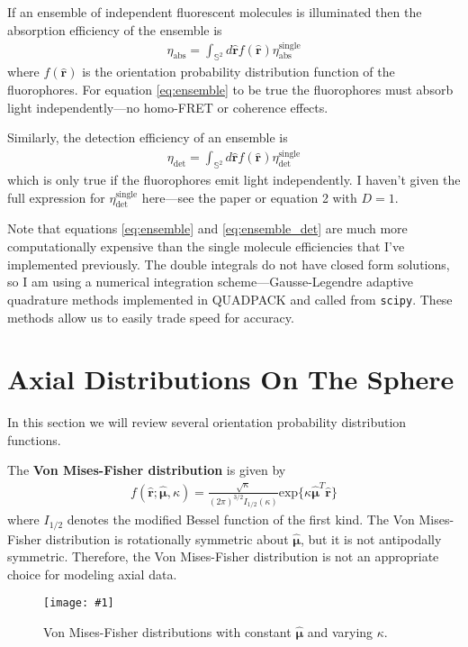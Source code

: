 \documentclass[11pt]{article}
\providecommand{\mh}[1]{\mathbf{\hat{#1}}}
\providecommand{\bs}[1]{\boldsymbol{#1}}
\providecommand{\fig}[4]{
\begin{figure}[h]
 \captionsetup{width=1.0\linewidth}
 \centering
 \texttt{[image: \#1]}
 \caption{#3}
 \label{fig:#4}
\end{figure}
}
\begin{document}
If an ensemble of independent fluorescent molecules is illuminated then the
absorption efficiency of the ensemble is
\begin{align}
  \eta_{\text{abs}} = \int_{\mathbb{S}^2}d\mh{r} f(\mh{r}) \eta_{\text{abs}}^{\text{single}} \label{eq:ensemble}%
\end{align} 
where $f(\mh{r})$ is the orientation probability distribution function of the
fluorophores. For equation \ref{eq:ensemble} to be true the fluorophores must
absorb light independently---no homo-FRET or coherence effects.

Similarly, the detection efficiency of an ensemble is
\begin{align}
  \eta_{\text{det}} = \int_{\mathbb{S}^2}d\mh{r} f(\mh{r}) \eta_{\text{det}}^{\text{single}} \label{eq:ensemble_det}%
\end{align} 
which is only true if the fluorophores emit light independently. I haven't given
the full expression for $\eta_{\text{det}}^{\text{single}}$ here---see the paper
or equation 2 with $D = 1$.

Note that equations \ref{eq:ensemble} and \ref{eq:ensemble_det} are much more
computationally expensive than the single molecule efficiencies that I've
implemented previously. The double integrals do not have closed form solutions,
so I am using a numerical integration scheme---Gausse-Legendre adaptive
quadrature methods implemented in QUADPACK and called from \texttt{scipy}. These
methods allow us to easily trade speed for accuracy.

\section{Axial Distributions On The Sphere}
In this section we will review several orientation probability distribution functions. 

The \textbf{Von Mises-Fisher distribution} is given by
\begin{align*}
  f(\mh{r}; \bs{\hat{\mu}}, \kappa) = \frac{\sqrt{\kappa}}{(2\pi{})^{3/2}I_{1/2}(\kappa)}\text{exp}\{\kappa \bs{\hat{\mu}}^T\mh{r}\}
\end{align*}
where $I_{1/2}$ denotes the modified Bessel function of the first kind. The Von
Mises-Fisher distribution is rotationally symmetric about $\bs{\hat{\mu}}$, but
it is not antipodally symmetric. Therefore, the Von Mises-Fisher distribution is
not an appropriate choice for modeling axial data.

\fig{../figures/vonmises.pdf}{1.0}{Von Mises-Fisher distributions with constant $\bs{\hat{\mu}}$ and varying $\kappa$. }{vonmises}
\end{document}
